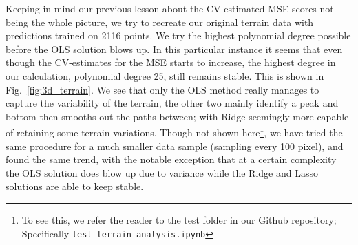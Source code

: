 \documentclass[reprint, english, nofootinbib]{revtex4-2}
\begin{document}




Keeping in mind our previous lesson about the CV-estimated MSE-scores not being the whole picture, we try to recreate our original terrain data with predictions trained on 2116 points. We try the highest polynomial degree possible before the OLS solution blows up. In this particular instance it seems that even though the CV-estimates for the MSE starts to increase, the highest degree in our calculation, polynomial degree 25, still remains stable. This is shown in Fig.~\ref{fig:3d_terrain}. We see that only the OLS method really manages to capture the variability of the terrain, the other two mainly identify a peak and bottom then smooths out the paths between; with Ridge seemingly more capable of retaining some terrain variations. Though not shown here\footnote{To see this, we refer the reader to the test folder in our Github repository; Specifically \lstinline{test_terrain_analysis.ipynb}}, we have tried the same procedure for a much smaller data sample (sampling every 100 pixel), and found the same trend, with the notable exception that at a certain complexity the OLS solution does blow up due to variance while the Ridge and Lasso solutions are able to keep stable.





\end{document}
